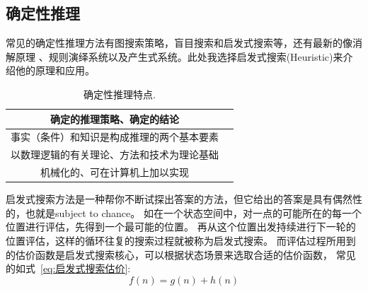 \documentclass[12pt,a4paper,UTF8]{ctexart}
\begin{document}
\subsection{确定性推理}
常见的确定性推理方法有图搜索策略，盲目搜索和启发式搜索等，还有最新的像消解原理
、规则演绎系统以及产生式系统。此处我选择启发式搜索(Heuristic)来介绍他的原理和应用。

\begin{table}[htb]
    \centering
    \caption{确定性推理特点.}
    \label{table:qdx特点}
    \begin{tabular}{@{}cc@{}}
    \toprule
    确定的推理策略、确定的结论                             \\ \hline
    \multicolumn{1}{l}{事实（条件）和知识是构成推理的两个基本要素} \\ \hline
    以数理逻辑的有关理论、方法和技术为理论基础                     \\ \hline
    机械化的、可在计算机上加以实现                           \\ \hline
    \toprule
    \end{tabular}
\end{table}

启发式搜索方法是一种帮你不断试探出答案的方法，但它给出的答案是具有偶然性的，也就是subject to chance。
如在一个状态空间中，对一点的可能所在的每一个位置进行评估，先得到一个最可能的位置。
再从这个位置出发持续进行下一轮的位置评估，这样的循环往复的搜索过程就被称为启发式搜索。
而评估过程所用到的估价函数是启发式搜索核心，可以根据状态场景来选取合适的估价函数，
常见的如式~\ref{eq:启发式搜索估价}:
\begin{equation}
    f(n)=g(n)+h(n)
    \label{eq:启发式搜索估价}
\end{equation}
\end{document}
